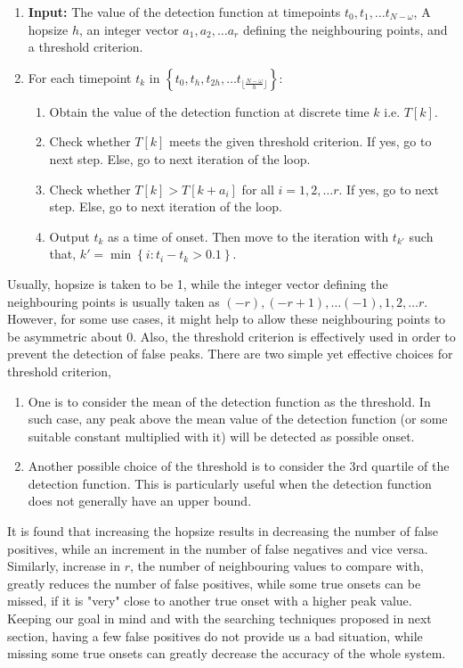 \documentclass[10pt]{article}
\begin{document}
\begin{enumerate}
    \item \textbf{Input:} The value of the detection function at timepoints $t_0, t_1, \dots t_{N-\omega}$, A hopsize $h$, an integer vector $a_1, a_2, \dots a_r$ defining the neighbouring points, and a threshold criterion.
    \item For each timepoint $t_k$ in $\left\{t_0, t_{h}, t_{2h}, \dots t_{\lfloor \frac{N-\omega}{h}\rfloor}\right\}$:
    \begin{enumerate}
        \item Obtain the value of the detection function at discrete time $k$ i.e. $T[k]$.
        \item Check whether $T[k]$ meets the given threshold criterion. If yes, go to next step. Else, go to next iteration of the loop.
        \item Check whether $T[k] > T[k+a_i]$ for all $i = 1,2,\dots r$. If yes, go to next step. Else, go to next iteration of the loop.
        \item Output $t_k$ as a time of onset. Then move to the iteration with $t_{k'}$ such that, $k' = \min\left\{i : t_{i} - t_{k} > 0.1\right\}$.
    \end{enumerate}
\end{enumerate}

Usually, hopsize is taken to be 1, while the integer vector defining the neighbouring points is usually taken as $(-r), (-r+1), \dots (-1), 1, 2, \dots r$. However, for some use cases, it might help to allow these neighbouring points to be asymmetric about 0. Also, the threshold criterion is effectively used in order to prevent the detection of false peaks. There are two simple yet effective choices for threshold criterion,

\begin{enumerate}
    \item One is to consider the mean of the detection function as the threshold. In such case, any peak above the mean value of the detection function (or some suitable constant multiplied with it) will be detected as possible onset.
    \item Another possible choice of the threshold is to consider the 3rd quartile of the detection function. This is particularly useful when the detection function does not generally have an upper bound.
\end{enumerate}

It is found that increasing the hopsize results in decreasing the number of false positives, while an increment in the number of false negatives and vice versa. Similarly, increase in $r$, the number of neighbouring values to compare with, greatly reduces the number of false positives, while some true onsets can be missed, if it is "very" close to another true onset with a higher peak value. Keeping our goal in mind and with the searching techniques proposed in next section, having a few false positives do not provide us a bad situation, while missing some true onsets can greatly decrease the accuracy of the whole system.
\end{document}
